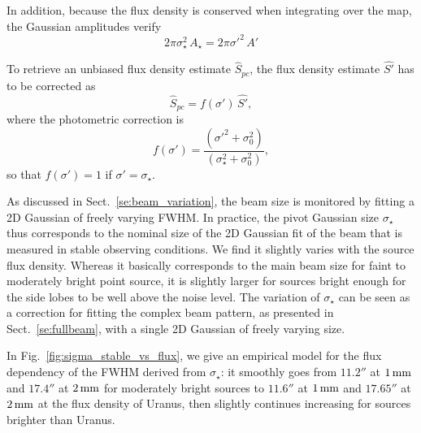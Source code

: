 {\lp In addition, because the flux density is conserved when integrating over the map,
the Gaussian amplitudes verify
\begin{equation}
2\pi \sigma_{\star}^2 \, A_{\star} = 2\pi \sigma'^2 \, A'
\label{eq:gaussian_amplitude}
\end{equation}}

To retrieve an unbiased flux density estimate $\hat{S}_{pc}$, the
flux density estimate $\hat{S'}$ has to be corrected as
\begin{equation}
  \hat{S}_{pc} = f(\sigma') \, \hat{S'},
\end{equation} 
where the photometric correction is 
\begin{equation}
  f(\sigma') = \frac{(\sigma'^2 + \sigma_0^2)}{(\sigma_\star^2+\sigma_0^2)}, 
\end{equation} 
so that $f(\sigma') = 1$ if $\sigma'=\sigma_\star$.

As discussed in Sect.~\ref{se:beam_variation}, the beam size is
monitored by fitting a 2D Gaussian of freely varying FWHM.
In practice, the pivot Gaussian size $\sigma_{\star}$ thus corresponds
to the nominal size of the 2D Gaussian fit of the beam that is
measured in stable observing conditions. We find it slightly varies with the
source flux density. Whereas it basically corresponds to the main beam
size for faint to moderately bright point source, it is slightly
larger for sources bright enough for the side lobes to be well above
the noise level. The variation of $\sigma_{\star}$ can be seen as a
correction for fitting the complex beam pattern, as presented in
Sect.~\ref{se:fullbeam}, with a single 2D Gaussian of freely varying
size.

In Fig.~\ref{fig:sigma_stable_vs_flux}, we give an
empirical model for the flux dependency of the FWHM derived from
$\sigma_{\star}$: it
smoothly goes from $11.2''$ at $1\,\rm{mm}$ and $17.4''$ at $2\,\rm{mm}$ for
moderately bright sources to $11.6''$ at $1\,\rm{mm}$ and $17.65''$ at
$2\,\rm{mm}$ at the flux density of Uranus,
then slightly continues increasing for sources brighter than Uranus.
